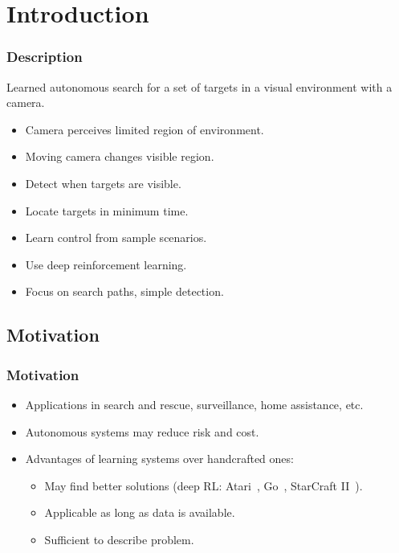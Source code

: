
\section{Introduction}

\begin{frame}
    \frametitle{Description}
    
    Learned autonomous search for a set of targets in a visual environment with a camera.

    \begin{itemize}
        \item Camera perceives limited region of environment.
        \item Moving camera changes visible region.
        \item Detect when targets are visible.
        \item Locate targets in minimum time.
        \item Learn control from sample scenarios.
        \item Use deep reinforcement learning.
        \item Focus on search paths, simple detection.
    \end{itemize}
\end{frame}

\subsection{Motivation}

\begin{frame}
    \frametitle{Motivation}
    
    \begin{itemize}
        \item Applications in search and rescue, surveillance, home assistance, etc.
        \item Autonomous systems may reduce risk and cost.
        \item Advantages of learning systems over handcrafted ones:
        \begin{itemize}
            \item May find better solutions (deep RL: Atari~\cite{mnih_human-level_2015}, Go~\cite{silver_mastering_2016}, StarCraft II~\cite{vinyals_grandmaster_2019}).
            \item Applicable as long as data is available. %
            \item Sufficient to describe problem. %
        \end{itemize}
    \end{itemize}
\end{frame}

